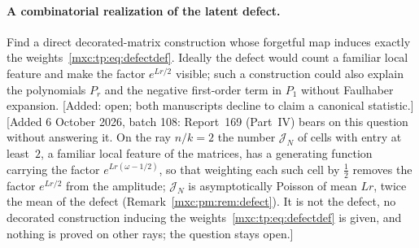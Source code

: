 \documentclass[11pt]{article}
\numberwithin{equation}{section}
\theoremstyle{definition}
\theoremstyle{remark}
\begin{document}
\paragraph{A combinatorial realization of the latent defect.} Find a
direct decorated-matrix construction whose forgetful map induces exactly
the weights~\eqref{mxc:tp:eq:defectdef}. Ideally the defect would count a
familiar local feature and make the factor $e^{Lr/2}$ visible; such a
construction could also explain the polynomials $P_r$ and the negative
first-order term in $P_1$ without Faulhaber expansion. [Added: open; both
manuscripts decline to claim a canonical statistic.] [Added 6 October 2026,
batch 108: Report~169 (Part~IV) bears on this question without answering
it. On the ray $n/k=2$ the number $\mathcal J_N$ of cells with entry at
least~$2$, a familiar local feature of the matrices, has a generating function
carrying the factor $e^{Lr(\omega-1/2)}$, so that weighting each such cell by
$\frac12$ removes the factor $e^{Lr/2}$ from the amplitude; $\mathcal J_N$ is
asymptotically Poisson of mean $Lr$, twice the mean of the defect
(Remark~\ref{mxc:pm:rem:defect}). It is not the defect, no decorated
construction inducing the weights~\eqref{mxc:tp:eq:defectdef} is given, and
nothing is proved on other rays; the question stays open.]
\end{document}
